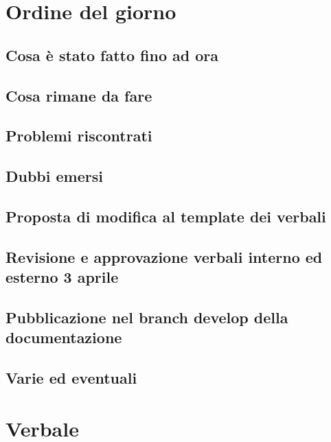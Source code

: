 \documentclass[italian,12pt]{article}
\begin{document}
\section{Ordine del giorno}
\subsection{Cosa è stato fatto fino ad ora}
\subsection{Cosa rimane da fare}
\subsection{Problemi riscontrati}
\subsection{Dubbi emersi}
\subsection{Proposta di modifica al template dei verbali}
\subsection{Revisione e approvazione verbali interno ed esterno 3 aprile}
\subsection{Pubblicazione nel branch develop della documentazione}
\subsection{Varie ed eventuali}

\newpage

\section{Verbale}
\end{document}
